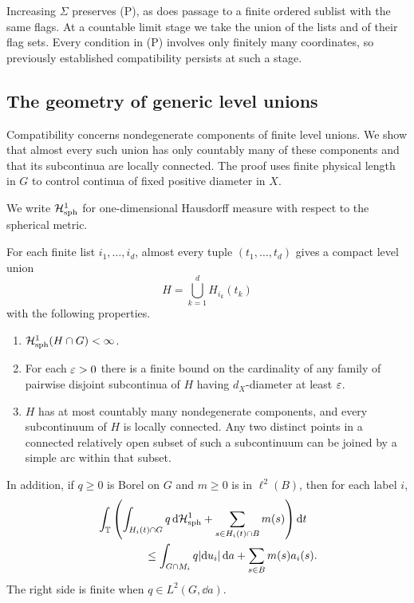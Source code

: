 Increasing $\Sigma$ preserves \textup{(P)}, as does passage to a
finite ordered sublist with the same flags.  At a countable limit
stage we take the union of the lists and of their flag sets.  Every
condition in \textup{(P)} involves only finitely many coordinates,
so previously established compatibility persists at such a stage.

\subsection{The geometry of generic level unions}

Compatibility concerns nondegenerate components of finite level
unions.  We show that almost every such union has only countably many
of these components and that its subcontinua are locally connected.
The proof uses finite physical length in $G$ to control continua of
fixed positive diameter in $X$.

We write $\mathcal H^1_{\mathrm{sph}}$ for one-dimensional Hausdorff measure
with respect to the spherical metric.

\begin{lemma}\label{lem:level-continua}
For each finite list $i_1,\ldots,i_d$, almost every tuple
$(t_1,\ldots,t_d)$ gives a compact level union
\[
 H=\bigcup_{k=1}^d H_{i_k}(t_k)
\]
with the following properties.
\begin{enumerate}[label=\textup{(\roman*)}]
\item $\mathcal H^1_{\mathrm{sph}}(H\cap G)<\infty$.
\item For each $\varepsilon>0$ there is a finite bound on the cardinality of
any family of pairwise disjoint subcontinua of $H$ having
$d_X$-diameter at least $\varepsilon$.
\item $H$ has at most countably many nondegenerate components, and
every subcontinuum of $H$ is locally connected.  Any two distinct
points in a connected relatively open subset of such a subcontinuum
can be joined by a simple arc within that subset.
\end{enumerate}
In addition, if $q\ge0$ is Borel on $G$ and $m\ge0$ is in
$\ell^2(B)$, then for each label $i$,
\begin{equation}\label{eq:weighted-level-bound}
 \begin{split}
 &\int_{\T}\left(
   \int_{H_i(t)\cap G}q\,\dd\HH^1_{\mathrm{sph}}
   +\sum_{s\in H_i(t)\cap B}m(s)\right)\dd t\\
 &\hspace{15mm}\le
   \int_{G\cap M_i}q|\dd u_i|\,\dd a
   +\sum_{s\in B}m(s)a_i(s).
 \end{split}
\end{equation}
The right side is finite when $q\in L^2(G,\dd a)$.
\end{lemma}

